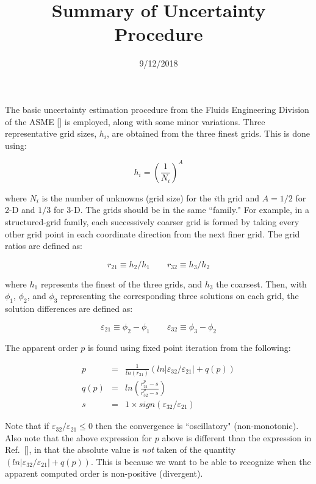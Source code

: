 \documentclass[handcarry]{aiaa-tc-mod}%
\title{Summary of Uncertainty Procedure}
\author{9/12/2018}
\def\ieps{\varepsilon}
\begin{document}
\maketitle


The basic uncertainty estimation procedure from the Fluids Engineering Division of the 
ASME [] is employed, along with some minor variations.
Three representative grid sizes, $h_i$, are
obtained from the three finest grids.  This is done using:

\begin{equation}
h_i = \left(\frac{1}{N_i}\right)^A
\end{equation}

\noindent where $N_i$ is the number of unknowns (grid size) for the $i$th grid and $A = 1/2$ for 2-D and $1/3$ for 3-D.
The grids should be in the same ``family."  For example, in a structured-grid family, each
successively coarser grid is formed by taking every other grid point in each coordinate direction
from the next finer grid.
The grid ratios are defined as:

\begin{equation}
r_{21} \equiv h_2/h_1 \qquad r_{32} \equiv h_3/h_2
\end{equation}

\noindent where $h_1$ represents the finest of the three grids, and $h_3$ the coarsest.  Then,
with $\phi_1$, $\phi_2$, and $\phi_3$ representing the corresponding three solutions on each grid, the
solution differences are defined as:

\begin{equation}
\ieps_{21} \equiv \phi_2 - \phi_1 \qquad \ieps_{32} \equiv \phi_3 - \phi_2
\end{equation}

\noindent The apparent order $p$ is found using fixed point iteration from the following:

\begin{eqnarray}
p &=& \frac{1}{ln(r_{21})} (ln|\ieps_{32}/\ieps_{21}| + q(p)) \\
q(p) &=& ln\left(\frac{r_{21}^p - s}{r_{32}^p - s} \right) \\
s &=& 1 \times sign(\ieps_{32}/\ieps_{21})
\end{eqnarray}

\noindent Note that if $\ieps_{32}/\ieps_{21} \le 0$ then the convergence is ``oscillatory"
(non-monotonic).  Also note that the above expression for $p$ above is different than the expression in
Ref.~[], in that the absolute value is {\it not} taken of the quantity
$(ln|\ieps_{32}/\ieps_{21}| + q(p))$.  This is because we want to be able to recognize when
the apparent computed order is non-positive (divergent).
\end{document}
